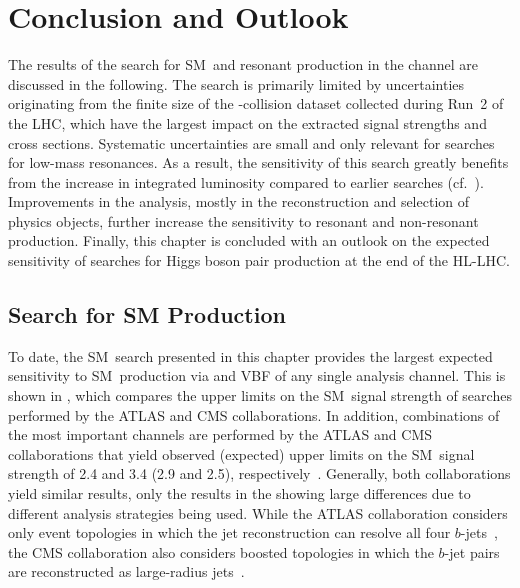 \section{Conclusion and Outlook}%
\label{sec:result_discussion}

The results of the search for SM~\HH and resonant \HH production in the
\bbtautau channel are discussed in the following. The search is primarily
limited by uncertainties originating from the finite size of the \pp-collision
dataset collected during Run~2 of the LHC, which have the largest impact on the
extracted signal strengths and cross sections. Systematic uncertainties are
small and only relevant for searches for low-mass resonances. As a result, the
sensitivity of this search greatly benefits from the increase in integrated
luminosity compared to earlier searches
(cf.~). Improvements in the analysis, mostly in
the reconstruction and selection of physics objects, further increase the
sensitivity to resonant and non-resonant \HH production. Finally, this chapter
is concluded with an outlook on the expected sensitivity of searches for Higgs
boson pair production at the end of the HL-LHC.

\subsection{Search for SM \HH Production}

To date, the SM~\HH search presented in this chapter provides the largest
expected sensitivity to SM~\HH production via \ggF and VBF of any single
analysis channel. This is shown in , which compares
the upper limits on the SM~\HH signal strength of searches performed by the
ATLAS and CMS collaborations. In addition, combinations of the most important
channels are performed by the ATLAS and CMS collaborations that yield observed
(expected) upper limits on the SM~\HH signal strength of 2.4 and 3.4 (2.9 and
2.5), respectively~\cite{HDBS-2022-03,CMS-HIG-22-001}.
Generally, both collaborations yield similar results, only the results in the
\bbbb showing large differences due to different analysis strategies being used.
While the ATLAS collaboration considers only event topologies in which the jet
reconstruction can resolve all four $b$-jets~\cite{ATLAS-CONF-2022-035}, the CMS
collaboration also considers boosted topologies in which the $b$-jet pairs are
reconstructed as large-radius jets~\cite{CMS-HIG-20-005,CMS-B2G-22-003}.

